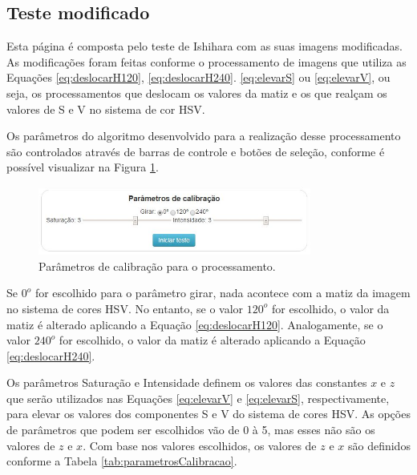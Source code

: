 \documentclass[	12pt, Times, openright, twoside, a4paper, english, brazil]{abntex2}
\begin{document}
\subsection{Teste modificado}
\label{subsec:testeModificado}

Esta página é composta pelo teste de Ishihara com as suas imagens modificadas. As modificações foram feitas conforme o processamento de imagens que utiliza as Equações \ref{eq:deslocarH120}, \ref{eq:deslocarH240}. \ref{eq:elevarS} ou \ref{eq:elevarV}, ou seja, os processamentos que deslocam os valores da matiz e os que realçam os valores de S e V no sistema de cor HSV.

Os parâmetros do algoritmo desenvolvido para a realização desse processamento são controlados através de barras de controle e botões de seleção, conforme é possível visualizar na Figura \ref{fig:figuraParametrosTeste}. 

\begin{figure}[!htb]
\centering \includegraphics[width=0.8\textwidth]{figuraParametrosCalibracao.jpg}
\caption{Parâmetros de calibração para o processamento.} \label{fig:figuraParametrosTeste}
\end{figure}

Se $0^o$ for escolhido para o parâmetro girar, nada acontece com a matiz da imagem no sistema de cores HSV. No entanto, se o valor $120^o$ for escolhido, o valor da matiz é alterado aplicando a Equação \ref{eq:deslocarH120}. Analogamente, se o valor $240^o$ for escolhido, o valor da matiz é alterado aplicando a Equação \ref{eq:deslocarH240}.

Os parâmetros Saturação e Intensidade definem os valores das constantes $x$ e $z$ que serão utilizados nas Equações \ref{eq:elevarV} e \ref{eq:elevarS}, respectivamente, para elevar os valores dos componentes S e V do sistema de cores HSV. As opções de parâmetros que podem ser escolhidos vão de 0 à 5, mas esses não são os valores de $z$ e $x$. Com base nos valores escolhidos, os valores de $z$ e $x$ são definidos conforme a Tabela \ref{tab:parametrosCalibracao}.
\end{document}

